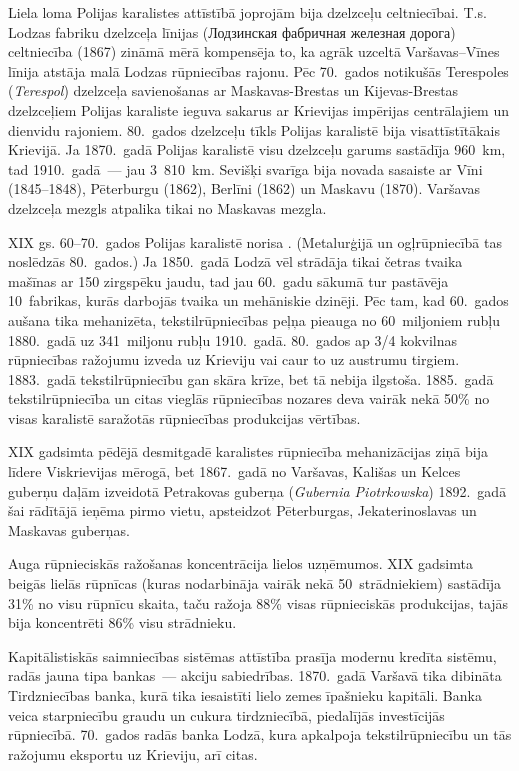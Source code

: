 \documentclass[twoside,a5paper,12pt,fleqn,openany]{extbook}
\newcommand{\pltxti}[1]{\textit{\textpolish{#1}}}
\newcommand{\rutxti}[1]{\textrussian{#1}}
\begin{document}
Liela loma Polijas karalistes attīstībā joprojām bija dzelzceļu celtniecībai. T.s. Lodzas fabriku dzelzceļa līnijas \rutxti{(Лодзинская фабричная железная дорога}) celtniecība (1867) zināmā mērā kompensēja to, ka agrāk uzceltā Varšavas--Vīnes līnija atstāja malā Lodzas rūpniecības rajonu. Pēc 70.~gados notikušās Terespoles (\pltxti{Terespol}) dzelzceļa savienošanas ar Maskavas-Brestas un Kijevas-Brestas dzelzceļiem Polijas karaliste ieguva sakarus ar Krievijas impērijas centrālajiem un dienvidu rajoniem. 80.~gados dzelzceļu tīkls Polijas karalistē bija visattīstītākais Krievijā. Ja 1870.~gadā Polijas karalistē visu dzelzceļu garums sastādīja 960~km, tad 1910.~gadā~--- jau 3~810~km. Sevišķi svarīga bija novada sasaiste ar Vīni (1845--1848), Pēterburgu (1862), Berlīni (1862) un Maskavu (1870). Varšavas dzelzceļa mezgls atpalika tikai no Maskavas mezgla.

XIX gs. 60--70.~gados Polijas karalistē norisa . (Metalurģijā un ogļrūpniecībā tas noslēdzās 80.~gados.) Ja 1850.~gadā Lodzā vēl strādāja tikai četras tvaika mašīnas ar 150 zirgspēku jaudu, tad jau 60.~gadu sākumā tur pastāvēja 10~fabrikas, kurās darbojās tvaika un mehāniskie dzinēji. Pēc tam, kad 60.~gados aušana tika mehanizēta, tekstilrūpniecības peļņa pieauga no 60~miljoniem rubļu 1880.~gadā uz 341~miljonu rubļu 1910.~gadā. 80.~gados ap 3/4 kokvilnas rūpniecības ražojumu izveda uz Krieviju vai caur to uz austrumu tirgiem. 1883.~gadā tekstilrūpniecību gan skāra krīze, bet tā nebija ilgstoša. 1885.~gadā tekstilrūpniecība un citas vieglās rūpniecības nozares deva vairāk nekā 50\% no visas karalistē saražotās rūpniecības produkcijas vērtības.

XIX gadsimta pēdējā desmitgadē karalistes rūpniecība mehanizācijas ziņā bija līdere Viskrievijas mērogā, bet 1867.~gadā no Varšavas, Kališas un Kelces guberņu daļām izveidotā Petrakovas guberņa (\pltxti{Gubernia Piotrkowska}) 1892.~gadā šai rādītājā ieņēma pirmo vietu, apsteidzot Pēterburgas, Jekaterinoslavas un Maskavas guberņas.

Auga rūpnieciskās ražošanas koncentrācija lielos uzņēmumos. XIX gadsimta beigās lielās rūpnīcas (kuras nodarbināja vairāk nekā 50~strādniekiem) sastādīja 31\% no visu rūpnīcu skaita, taču ražoja 88\% visas rūpnieciskās produkcijas, tajās bija koncentrēti 86\% visu strādnieku.

Kapitālistiskās saimniecības sistēmas attīstība prasīja modernu kredīta sistēmu, radās jauna tipa bankas~--- akciju sabiedrības. 1870.~gadā Varšavā tika dibināta Tirdzniecības banka, kurā tika iesaistīti lielo zemes īpašnieku kapitāli. Banka veica starpniecību graudu un cukura tirdzniecībā, piedalījās investīcijās rūpniecībā. 70.~gados radās banka Lodzā, kura apkalpoja tekstilrūpniecību un tās ražojumu eksportu uz Krieviju, arī citas.
\end{document}
